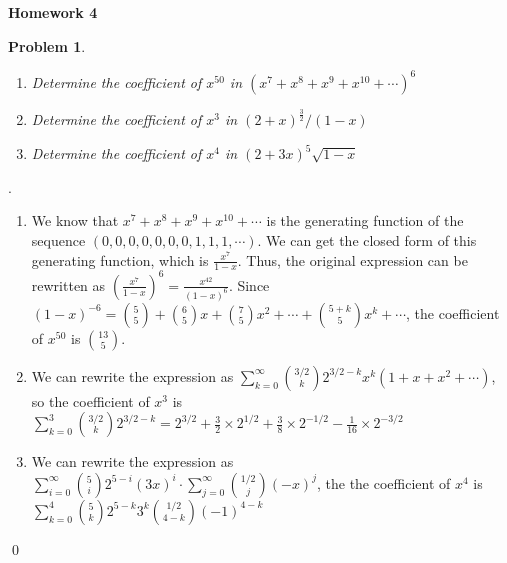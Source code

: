\documentclass[12pt]{article}
\date{Feb 14, 2012}
\newtheorem{hw}{Problem}
\newenvironment{sol}
  {\par\vspace{3mm}\noindent{\it Solution}.}
  {\qed}
\begin{document}
\begin{center}
{\LARGE\bf Homework 4}\\
\vspace{2mm}
\end{center}


\begin{hw}
  \begin{enumerate}
    \item  Determine the coefficient of $x^{50}$ in $(x^7+x^8+x^9+x^{10}+\cdots)^6$
    \item  Determine the coefficient of $x^3$ in $(2+x)^{\frac{3}{2}}/(1-x)$
    \item  Determine the coefficient of $x^4$ in $(2+3x)^{5}\sqrt{1-x}$
  \end{enumerate}
\end{hw}
\begin{sol}
	\begin{enumerate}
		\item We know that $x^7 + x^8 + x^9 + x^{10} + \cdots$ is the generating function of the sequence $(0,0,0,0,0,0,0,1,1,1,\cdots)$. We can get the closed form of this generating function, which is $\frac{x^7}{1-x}$. Thus, the original expression can be rewritten as $\left(\frac{x^7}{1-x}\right)^6 = \frac{x^{42}}{(1-x)^6}$. Since $(1-x)^{-6} = {5 \choose 5} + {6 \choose 5}x + {7 \choose 5}x^2 + \cdots + {5+k \choose 5}x^k + \cdots$, the coefficient of $x^{50}$ is ${13 \choose 5}$.
		
		\item We can rewrite the expression as $\sum_{k=0}^{\infty}{3/2 \choose k}2^{3/2 - k}x^k(1+x+x^2+\cdots)$, so the coefficient of $x^3$ is $\sum_{k=0}^{3}{3/2 \choose k}2^{3/2 - k} = 2^{3/2} +\frac{3}{2}\times2^{1/2} + \frac{3}{8} \times 2^{-1/2} - \frac{1}{16}\times 2^{-3/2}$
		
		\item We can rewrite the expression as $\sum_{i=0}^{\infty}{5 \choose i}2^{5-i}(3x)^i\cdot\sum_{j=0}^{\infty}{1/2 \choose j}(-x)^j$, the the coefficient of $x^4$ is $\sum_{k=0}^{4}{5 \choose k}2^{5-k}3^{k}{1/2 \choose 4-k}(-1)^{4-k}$
	\end{enumerate}
\end{sol}
\end{document}
